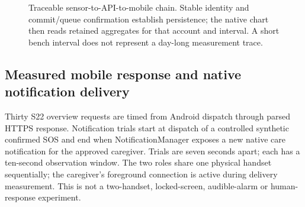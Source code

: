 \begin{figure}[H]\centering
{}
\caption{Traceable sensor-to-API-to-mobile chain. Stable identity and commit/queue confirmation establish persistence; the native chart then reads retained aggregates for that account and interval. A short bench interval does not represent a day-long measurement trace.}\label{fig:physical-trace}
\end{figure}

\subsection{Measured mobile response and native notification delivery}
Thirty S22 overview requests are timed from Android dispatch through parsed HTTPS response. Notification trials start at dispatch of a controlled synthetic confirmed SOS and end when NotificationManager exposes a new native care notification for the approved caregiver. Trials are seven seconds apart; each has a ten-second observation window. The two roles share one physical handset sequentially; the caregiver's foreground connection is active during delivery measurement. This is not a two-handset, locked-screen, audible-alarm or human-response experiment.

